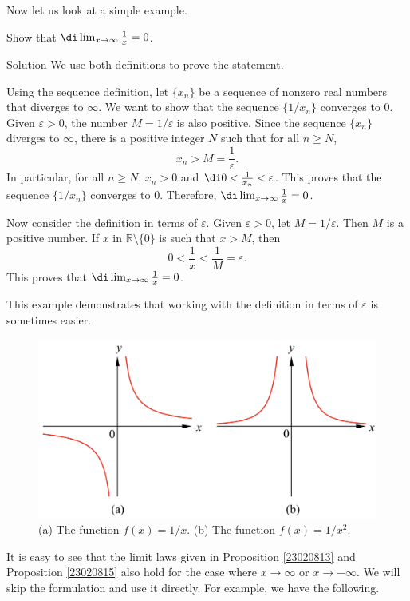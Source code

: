 Now let us look at a simple example.
\begin{example}[label=23020903]{}
Show that $\di\lim_{x\rightarrow\infty}\frac{1}{x}=0$.
\end{example}
\begin{solution}{Solution}
We use both definitions to prove the statement.

Using the sequence definition, let $\{x_n\}$ be a sequence of nonzero real numbers that diverges to $\infty$. We want to show that the sequence $\{1/x_n\}$ converges to 0. Given $\varepsilon>0$, the number $M=1/\varepsilon$ is also positive. Since the sequence $\{x_n\}$ diverges to $\infty$, there is a positive integer $N$ such that for all $n\geq N$, 
\[x_n>M=\frac{1}{\varepsilon}.\] In particular, for all $n\geq N$, $x_n>0$ and
$\di 0<\frac{1}{x_n}<\varepsilon$. This proves that the sequence $\{1/x_n\}$ converges to 0. Therefore, $\di \lim_{x\rightarrow\infty}\frac{1}{x}=0$. 



Now consider the definition in terms of $\varepsilon$. Given $\varepsilon>0$, let $M=1/\varepsilon$. Then $M$ is a positive number. If $x$ in $\mathbb{R}\setminus\{0\}$ is such that $x>M$, then
\[0<\frac{1}{x}<\frac{1}{M}=\varepsilon.\]
This proves that $\di\lim_{x\rightarrow\infty}\frac{1}{x}=0$.
\end{solution}


This example demonstrates that working with the definition in terms of $\varepsilon$ is sometimes easier.

 \begin{figure}[ht]
\centering
\includegraphics[scale=0.2]{Picture8.png}
\caption{  (a) The function $f(x)=1/x$. (b) The function $f(x)=1/x^2$.}\label{figure8}
\end{figure}

It is easy to see that the limit laws given in Proposition \ref{23020813} and Proposition \ref{23020815} also hold for the case where $x\rightarrow \infty$ or $x\rightarrow -\infty$. We will skip the formulation and use it directly. For example, we have the following.

